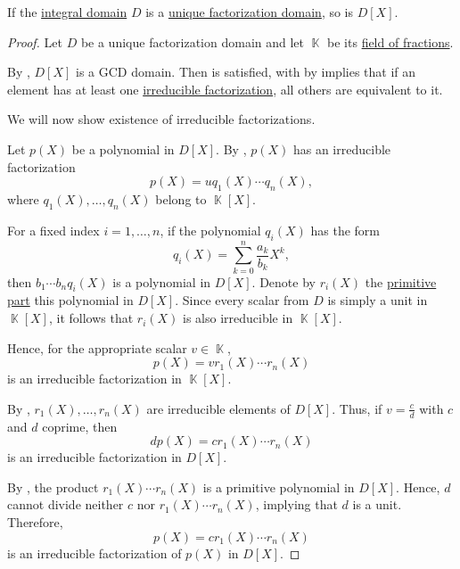 \begin{proposition}\label{thm:polynomial_ring_over_ufd}
  If the \hyperref[def:integral_domain]{integral domain} \( D \) is a \hyperref[def:unique_factorization_domain]{unique factorization domain}, so is \( D[X] \).
\end{proposition}
\begin{proof}
  Let \( D \) be a unique factorization domain and let \( \BbbK \) be its \hyperref[thm:field_of_fractions]{field of fractions}.

  By , \( D[X] \) is a GCD domain. Then  is satisfied, with by  implies that if an element has at least one \hyperref[def:irreducible_factorization]{irreducible factorization}, all others are equivalent to it.

  We will now show existence of irreducible factorizations.

  Let \( p(X) \) be a polynomial in \( D[X] \). By , \( p(X) \) has an irreducible factorization
  \begin{equation*}
    p(X) = u q_1(X) \cdots q_n(X),
  \end{equation*}
  where \( q_1(X), \ldots, q_n(X) \) belong to \( \BbbK[X] \).

  For a fixed index \( i = 1, \ldots, n \), if the polynomial \( q_i(X) \) has the form
  \begin{equation*}
    q_i(X) = \sum_{k=0}^n \frac {a_k} {b_k} X^k,
  \end{equation*}
  then \( b_1 \cdots b_n q_i(X) \) is a polynomial in \( D[X] \). Denote by \( r_i(X) \) the \hyperref[def:polynomial_content]{primitive part} this polynomial in \( D[X] \). Since every scalar from \( D \) is simply a unit in \( \BbbK[X] \), it follows that \( r_i(X) \) is also irreducible in \( \BbbK[X] \).

  Hence, for the appropriate scalar \( v \in \BbbK \),
  \begin{equation*}
    p(X) = v r_1(X) \cdots r_n(X)
  \end{equation*}
  is an irreducible factorization in \( \BbbK[X] \).

  By , \( r_1(X), \ldots, r_n(X) \) are irreducible elements of \( D[X] \). Thus, if \( v = \tfrac c d \) with \( c \) and \( d \) coprime, then
  \begin{equation*}
    d p(X) = c r_1(X) \cdots r_n(X)
  \end{equation*}
  is an irreducible factorization in \( D[X] \).

  By , the product \( r_1(X) \cdots r_n(X) \) is a primitive polynomial in \( D[X] \). Hence, \( d \) cannot divide neither \( c \) nor \( r_1(X) \cdots r_n(X) \), implying that \( d \) is a unit. Therefore,
  \begin{equation*}
    p(X) = c r_1(X) \cdots r_n(X)
  \end{equation*}
  is an irreducible factorization of \( p(X) \) in \( D[X] \).
\end{proof}
